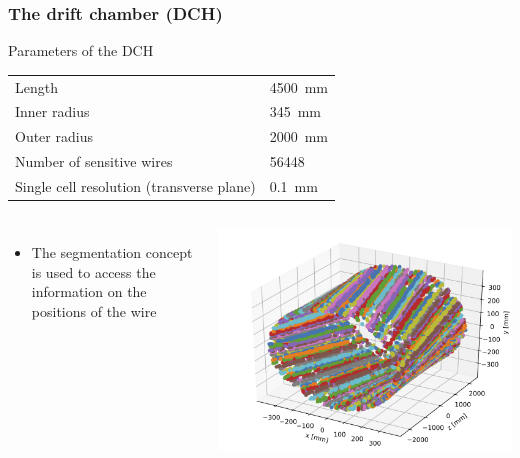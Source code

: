 \documentclass[hyperref={colorlinks=true,pdfpagelabels=false,linkcolor=black}, xcolor=dvipsnames,10pt]{beamer}
\begin{document}
\begin{frame}
	\frametitle{The drift chamber (DCH)}

  \begin{block}{Parameters of the DCH}
    \vspace{0.5cm}
    \begin{tabular}{l l}
      \toprule
      Length & 4500~mm \\
      Inner radius & 345~mm \\
      Outer radius & 2000~mm\\
      Number of sensitive wires & 56448 \\
      Single cell resolution (transverse plane) & 0.1~mm \\
      \bottomrule
    \end{tabular}
  \end{block}

	\begin{columns}
		\begin{itemize}
		  \item The segmentation concept is used to access the information on the positions of the wire
		\end{itemize}

		\centering
		\includegraphics[width=\textwidth]{./figures/allHits}
	\end{columns}


\end{frame}
\end{document}
